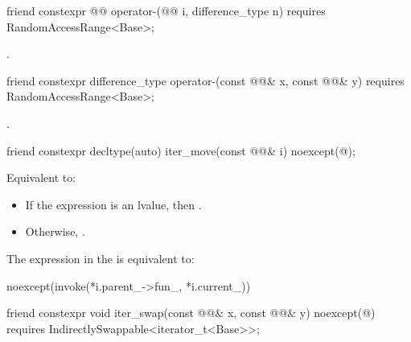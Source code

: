 %
\begin{itemdecl}
friend constexpr @@ operator-(@@ i, difference_type n)
  requires RandomAccessRange<Base>;
\end{itemdecl}

\begin{itemdescr}
\pnum
\returns {}.
\end{itemdescr}

%
\begin{itemdecl}
friend constexpr difference_type operator-(const @@& x, const @@& y)
  requires RandomAccessRange<Base>;
\end{itemdecl}

\begin{itemdescr}
\pnum
\returns {}.
\end{itemdescr}

\begin{itemdecl}
friend constexpr decltype(auto) iter_move(const @@& i)
noexcept(@\seebelow@);
\end{itemdecl}

\begin{itemdescr}
\pnum
\effects Equivalent to:
\begin{itemize}
\item If the expression  is an lvalue, then
.
\item Otherwise, .
\end{itemize}

\pnum
\remarks The expression in the  is equivalent to:
\begin{codeblock}
noexcept(invoke(*i.parent_->fun_, *i.current_))
\end{codeblock}
\end{itemdescr}

\begin{itemdecl}
friend constexpr void iter_swap(const @@& x, const @@& y)
noexcept(@\seebelow@) requires IndirectlySwappable<iterator_t<Base>>;
\end{itemdecl}

